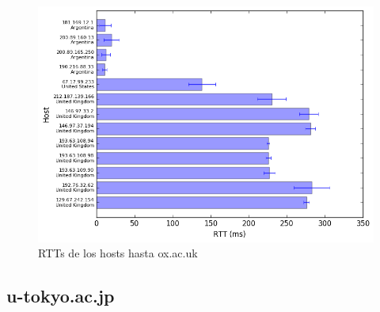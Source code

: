 \begin{figure}[H]
\caption{RTTs de los hosts hasta ox.ac.uk}
\includegraphics[width=\textwidth,keepaspectratio]{images/oxford.png}
\end{figure}

\subsection{u-tokyo.ac.jp}

